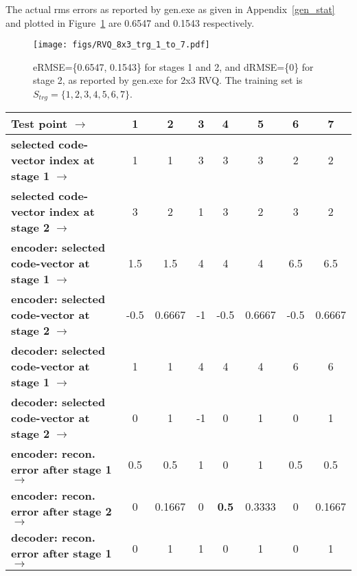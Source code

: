 The actual rms errors as reported by gen.exe as given in Appendix~\ref{gen_stat} and plotted in Figure~\ref{fig:RVQ_8x3_trg_1_to_7} are 0.6547 and 0.1543 respectively.


\begin{figure}
\centering
\texttt{[image: figs/RVQ\_8x3\_trg\_1\_to\_7.pdf]}
\caption{eRMSE=\{0.6547, 0.1543\} for stages 1 and 2, and dRMSE=\{0\} for stage 2, as reported by gen.exe for 2x3 RVQ.  The training set is $S_{trg}=\{1,2,3,4,5,6,7\}$.}
\label{fig:RVQ_8x3_trg_1_to_7}
\end{figure}


\begin{table}[t]
\centering
\begin{tabular}{|l||c|c|c|c|c|c|c|}\hline 
\textbf{Test point} $\rightarrow$                             & \textbf{1}  &\textbf{2} &\textbf{3}   &\textbf{4}   &\textbf{5} &\textbf{6} &\textbf{7} \\\hline
\textbf{selected code-vector index at stage 1} $\rightarrow$ & 1     &  1   &  3   &  3   &  3   &  2     & 2 \\
\textbf{selected code-vector index at stage 2} $\rightarrow$ & 3     & 2     & 1   &  3   &  2   &  3     & 2 \\\hline
\textbf{encoder: selected code-vector at stage 1} $\rightarrow$& 1.5     &1.5           &  4   &  4           &  4             &  6.5     & 6.5 \\
\textbf{encoder: selected code-vector at stage 2} $\rightarrow$& -0.5     & 0.6667     & -1   &  -0.5       &  0.6667   &  -0.5     & 0.6667 \\\hline
\textbf{decoder: selected code-vector at stage 1} $\rightarrow$& 1     &1           &  4   &  4           &  4             &  6     & 6 \\
\textbf{decoder: selected code-vector at stage 2} $\rightarrow$& 0     & 1     & -1   &  0       &  1   &  0     & 1 \\\hline
\textbf{encoder: recon. error after stage 1} $\rightarrow$& \color{blue}0.5  & \color{blue}0.5   &  \color{blue}1     &   0   &   \color{blue}1   &   \color{blue}0.5 & \color{blue}0.5 \\
\textbf{encoder: recon. error after stage 2} $\rightarrow$ & 0   &  \color{darkgreen}0.1667     &  0   &\color{darkgreen}\textbf{0.5}&   \color{darkgreen}0.3333    &   0   & \color{darkgreen}0.1667 \\\hline
\textbf{decoder: recon. error after stage 1} $\rightarrow$        & 0       & 1     & 1   & 0         &  1   &  0         & 1 \\

\end{tabular}
\end{table}
